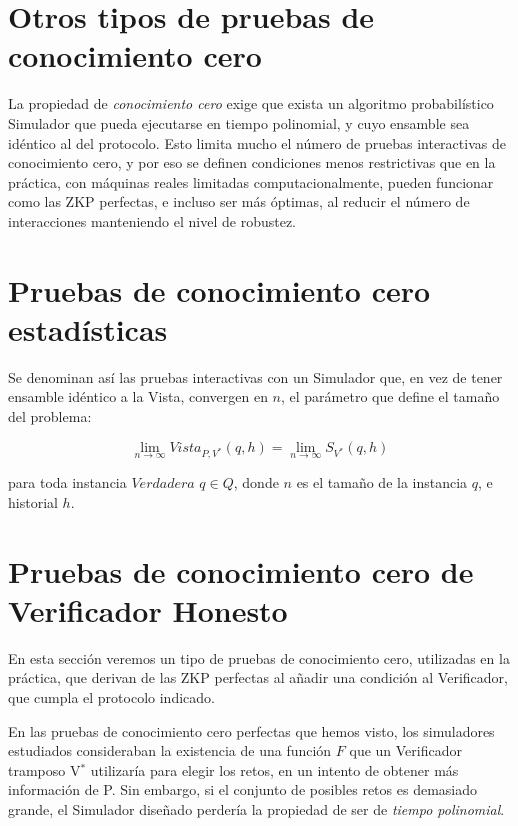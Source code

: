 \section{Otros tipos de pruebas de conocimiento cero}

La propiedad de \textit{conocimiento cero} exige que exista un algoritmo probabilístico Simulador que pueda ejecutarse en tiempo polinomial, y cuyo ensamble sea idéntico al del protocolo. Esto limita mucho el número de pruebas interactivas de conocimiento cero, y por eso se definen condiciones menos restrictivas que en la práctica, con máquinas reales limitadas computacionalmente, pueden funcionar como las ZKP perfectas, e incluso ser más óptimas, al reducir el número de interacciones manteniendo el nivel de robustez.

\hfil

\section{Pruebas de conocimiento cero estadísticas}

\hfil

Se denominan así las pruebas interactivas con un Simulador que, en vez de tener ensamble idéntico a la Vista, convergen en $n$, el parámetro que define el tamaño del problema:
\begin{center}
	$$
	\lim_{n\to\infty} Vista_{P,V^*}(q,h) =  \lim_{n\to\infty} S_{V^*}(q,h)
	$$
\end{center}

para toda instancia $Verdadera$ $q\in Q$, donde $n$ es el tamaño de la instancia $q$, e historial $h$. 

\hfil





\section{Pruebas de conocimiento cero de Verificador Honesto}



En esta sección veremos un tipo de pruebas de conocimiento cero, utilizadas en la práctica, que derivan de las ZKP perfectas al añadir una condición al Verificador, que cumpla el protocolo indicado.

En las pruebas de conocimiento cero perfectas que hemos visto, los simuladores estudiados consideraban la existencia de una función $F$ que un Verificador tramposo V$^*$ utilizaría para elegir los retos, en un intento de obtener más información de P. Sin embargo, si el conjunto de posibles retos es demasiado grande, el Simulador diseñado perdería la propiedad de ser de \textit{tiempo polinomial}.

